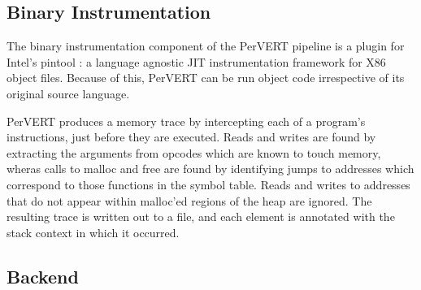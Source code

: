 \documentclass[annual]{acmsiggraph}
\begin{document}
  \subsection{Binary Instrumentation}

    The binary instrumentation component of the PerVERT pipeline is a plugin for Intel's pintool \cite{Luk:2005:PBC:1065010.1065034}:
      a language agnostic JIT instrumentation framework for X86 object files.
    Because of this, PerVERT can be run object code irrespective of its original source language.

    PerVERT produces a memory trace by intercepting each of a program's instructions, just before they are executed.
    Reads and writes are found by extracting the arguments from opcodes which are known to touch memory,
      wheras calls to malloc and free are found by identifying jumps to addresses which correspond to those functions
      in the symbol table.
    Reads and writes to addresses that do not appear within malloc'ed regions of the heap are ignored.  
    The resulting trace is written out to a file, and each element is annotated with the stack context in which it occurred.  

  \subsection{Backend}
\end{document}
